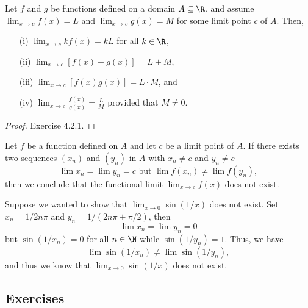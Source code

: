 \begin{tcolorbox}
    \begin{cor}
    Let \( f \) and \( g \) be functions defined on a domain \( A \subseteq \R  \), and assume \( \lim_{ x \to c } f(x) = L  \) and \( \lim_{ x \to c } g(x) = M  \) for some limit point \( c \) of \( A  \). Then, 
    \begin{enumerate}
        \item[(i)] \( \lim_{ x \to c } kf(x) = kL  \) for all \( k \in \R  \),
        \item[(ii)] \( \lim_{ x \to c } [f(x) + g(x)] = L + M, \)
        \item[(iii)] \( \lim_{ x \to c } [f(x)g(x)] = L \cdot M  \), and 
        \item[(iv)] \( \lim_{ x \to c } \frac{ f(x) }{ g(x)  } = \frac{ L }{ M }  \) provided that \( M \neq  0 \).
    \end{enumerate}
    \end{cor}
\end{tcolorbox}

\begin{proof}
Exercise 4.2.1.
\end{proof}


\begin{tcolorbox}
    \begin{cor}
    Let \( f \) be a function defined on \( A  \) and let \( c  \) be a limit point of \( A  \). If there exists two sequences \( (x_n) \) and \( (y_n) \) in \( A  \) with \( x_n \neq  c \) and \( y_n \neq c  \) 
    \[  \lim x_n = \lim y_n = c \text{~but~} \lim f(x_n) \neq \lim f(y_n),  \]
    then we conclude that the functional limit \( \lim_{x \to c } f(x)  \) does not exist.
    \end{cor}
\end{tcolorbox}

\begin{ex}
Suppose we wanted to show that \( \lim_{ x \to 0 } \sin(1/x) \) does not exist. Set \( x_n = 1/2n\pi \) and \( y_n = 1 / (2n\pi + \pi/2 ) \), then 
\[  \lim x_n = \lim y_n = 0  \] but
\( \sin(1/x_n) = 0  \) for all \( n \in \N  \) while \( \sin(1/y_n) = 1  \). Thus, we have 
\[  \lim \sin(1/x_n) \neq \lim  \sin (1/y_n), \]
and thus we know that \( \lim_{x \to  0 } \sin(1/x)  \) does not exist.
\end{ex}

\subsection{Exercises}
